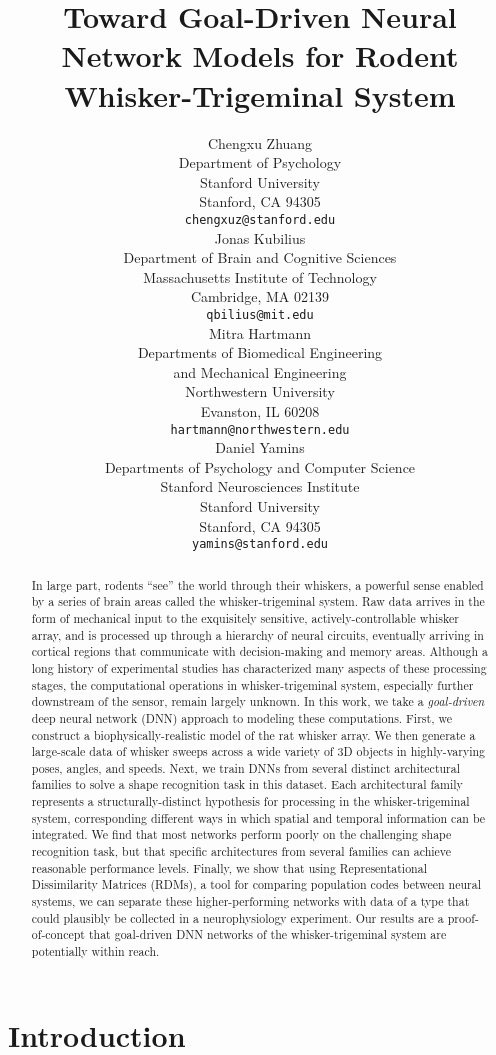 \documentclass{article}
\title{Toward Goal-Driven Neural Network Models for Rodent Whisker-Trigeminal System}
\author{
Chengxu Zhuang\\
Department of Psychology\\
Stanford University\\
Stanford, CA 94305 \\
\texttt{chengxuz@stanford.edu} \\
\And
Jonas Kubilius \\
Department of Brain and Cognitive Sciences \\
Massachusetts Institute of Technology \\
Cambridge, MA  02139\\
\texttt{qbilius@mit.edu} \\
\And
Mitra Hartmann \\
Departments of Biomedical Engineering \\
and Mechanical Engineering \\
Northwestern University \\
Evanston, IL  60208\\
\texttt{hartmann@northwestern.edu} \\
\And
Daniel Yamins \\
Departments of Psychology and Computer Science \\
Stanford Neurosciences Institute \\
Stanford University \\
Stanford, CA 94305 \\
\texttt{yamins@stanford.edu} \\
}
\begin{document}

\maketitle

\begin{abstract}
In large part, rodents ``see'' the world through their whiskers, a powerful sense enabled by a series of brain areas called the whisker-trigeminal system. 
Raw data arrives in the form of mechanical input to the exquisitely sensitive, actively-controllable whisker array, and is processed up through a hierarchy of neural circuits, eventually arriving in cortical regions that communicate with decision-making and memory areas.
Although a long history of experimental studies has characterized many aspects of these processing stages, the computational operations in whisker-trigeminal system, especially further downstream of the sensor, remain largely unknown.
In this work, we take a \emph{goal-driven} deep neural network (DNN) approach to modeling these computations.
First, we construct a biophysically-realistic model of the rat whisker array.  
We then generate a large-scale data of whisker sweeps across a wide variety of 3D objects in highly-varying poses, angles, and speeds.
Next, we train DNNs from several distinct architectural families to solve a shape recognition task in this dataset. 
Each architectural family represents a structurally-distinct hypothesis for processing in the whisker-trigeminal system,  corresponding different ways in which spatial and temporal information can be integrated.
We find that most networks perform poorly on the challenging shape recognition task, but that specific architectures from several families can achieve reasonable performance levels.
Finally, we show that using Representational Dissimilarity Matrices (RDMs), a tool for comparing population codes between neural systems, we can separate these higher-performing networks with data of a type that could plausibly be collected in a neurophysiology experiment.
Our results are a proof-of-concept that goal-driven DNN networks of the whisker-trigeminal system are potentially within reach.
\end{abstract}


\section{Introduction} %

\end{document}
